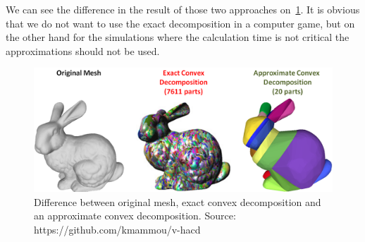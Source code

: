 We can see the difference in the result of those two approaches on~\cref{fig:bunny}. It is obvious that we do not want to use the exact decomposition in a computer game, but on the other hand for the simulations where the calculation time is not critical the approximations should not be used.
\begin{figure}
        \centering
        \includegraphics[width=\textwidth]{img/bunny}
        \caption{Difference between original mesh, exact convex decomposition and an approximate convex decomposition. Source: https://github.com/kmammou/v-hacd}
        \label{fig:bunny}
\end{figure}


